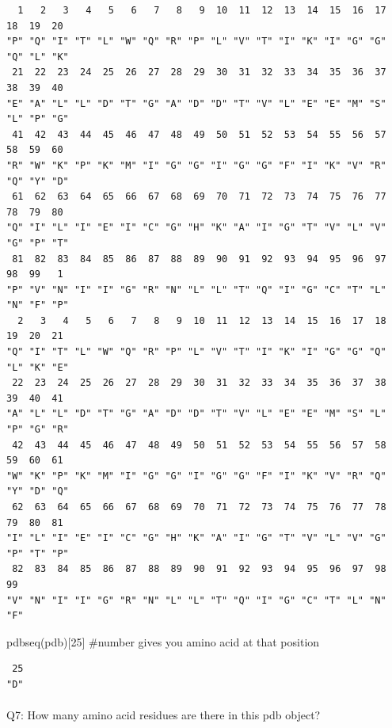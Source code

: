 \documentclass[
  letterpaper,
  DIV=11,
  numbers=noendperiod]{scrartcl}
\makeatletter
\let\oldparagraph\paragraph
\renewcommand{\paragraph}{
    \@ifstar
      \xxxParagraphStar
      \xxxParagraphNoStar
  }
\newcommand{\xxxParagraphStar}[1]{\oldparagraph*{#1}\mbox{}}
\newcommand{\xxxParagraphNoStar}[1]{\oldparagraph{#1}\mbox{}}
\newenvironment{Shaded}{\begin{snugshade}}{\end{snugshade}}
\newcommand{\CommentTok}[1]{\textcolor[rgb]{0.37,0.37,0.37}{#1}}
\newcommand{\DecValTok}[1]{\textcolor[rgb]{0.68,0.00,0.00}{#1}}
\newcommand{\FunctionTok}[1]{\textcolor[rgb]{0.28,0.35,0.67}{#1}}
\newcommand{\NormalTok}[1]{\textcolor[rgb]{0.00,0.23,0.31}{#1}}
\makeatother
\begin{document}
\begin{verbatim}
  1   2   3   4   5   6   7   8   9  10  11  12  13  14  15  16  17  18  19  20 
"P" "Q" "I" "T" "L" "W" "Q" "R" "P" "L" "V" "T" "I" "K" "I" "G" "G" "Q" "L" "K" 
 21  22  23  24  25  26  27  28  29  30  31  32  33  34  35  36  37  38  39  40 
"E" "A" "L" "L" "D" "T" "G" "A" "D" "D" "T" "V" "L" "E" "E" "M" "S" "L" "P" "G" 
 41  42  43  44  45  46  47  48  49  50  51  52  53  54  55  56  57  58  59  60 
"R" "W" "K" "P" "K" "M" "I" "G" "G" "I" "G" "G" "F" "I" "K" "V" "R" "Q" "Y" "D" 
 61  62  63  64  65  66  67  68  69  70  71  72  73  74  75  76  77  78  79  80 
"Q" "I" "L" "I" "E" "I" "C" "G" "H" "K" "A" "I" "G" "T" "V" "L" "V" "G" "P" "T" 
 81  82  83  84  85  86  87  88  89  90  91  92  93  94  95  96  97  98  99   1 
"P" "V" "N" "I" "I" "G" "R" "N" "L" "L" "T" "Q" "I" "G" "C" "T" "L" "N" "F" "P" 
  2   3   4   5   6   7   8   9  10  11  12  13  14  15  16  17  18  19  20  21 
"Q" "I" "T" "L" "W" "Q" "R" "P" "L" "V" "T" "I" "K" "I" "G" "G" "Q" "L" "K" "E" 
 22  23  24  25  26  27  28  29  30  31  32  33  34  35  36  37  38  39  40  41 
"A" "L" "L" "D" "T" "G" "A" "D" "D" "T" "V" "L" "E" "E" "M" "S" "L" "P" "G" "R" 
 42  43  44  45  46  47  48  49  50  51  52  53  54  55  56  57  58  59  60  61 
"W" "K" "P" "K" "M" "I" "G" "G" "I" "G" "G" "F" "I" "K" "V" "R" "Q" "Y" "D" "Q" 
 62  63  64  65  66  67  68  69  70  71  72  73  74  75  76  77  78  79  80  81 
"I" "L" "I" "E" "I" "C" "G" "H" "K" "A" "I" "G" "T" "V" "L" "V" "G" "P" "T" "P" 
 82  83  84  85  86  87  88  89  90  91  92  93  94  95  96  97  98  99 
"V" "N" "I" "I" "G" "R" "N" "L" "L" "T" "Q" "I" "G" "C" "T" "L" "N" "F" 
\end{verbatim}

\begin{Shaded}
\begin{Highlighting}[]
\FunctionTok{pdbseq}\NormalTok{(pdb)[}\DecValTok{25}\NormalTok{] }\CommentTok{\#number gives you amino acid at that position }
\end{Highlighting}
\end{Shaded}

\begin{verbatim}
 25 
"D" 
\end{verbatim}

\paragraph{Q7: How many amino acid residues are there in this pdb
object?}\label{q7-how-many-amino-acid-residues-are-there-in-this-pdb-object}
\end{document}
